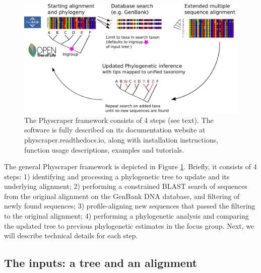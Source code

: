 \documentclass[]{article}
\begin{document}
\begin{figure}

{\centering \includegraphics[width=0.85\linewidth]{docs/figs/schematic} 

}

\caption{The Physcraper framework consists of 4 steps (see text). The software is fully described on its documentation website at physcraper.readthedocs.io, along with installation instructions, function usage descriptions, examples and tutorials.}\label{fig:framework}
\end{figure}

The general Physcraper framework is depicted in Figure \ref{fig:framework}. Briefly, it consists of 4 steps: 1) identifying and processing a phylogenetic tree to update and its underlying alignment; 2) performing a constrained BLAST search of sequences from the original alignment on the GenBank DNA database, and filtering of newly found sequences; 3) profile-aligning new sequences that passed the filtering to the original alignment; 4) performing a phylogenetic analysis and comparing the updated tree to previous phylogenetic estimates in the focus group. Next, we will describe technical details for each step.

\hypertarget{the-inputs-a-tree-and-an-alignment}{%
\subsection{The inputs: a tree and an alignment}\label{the-inputs-a-tree-and-an-alignment}}
\end{document}
